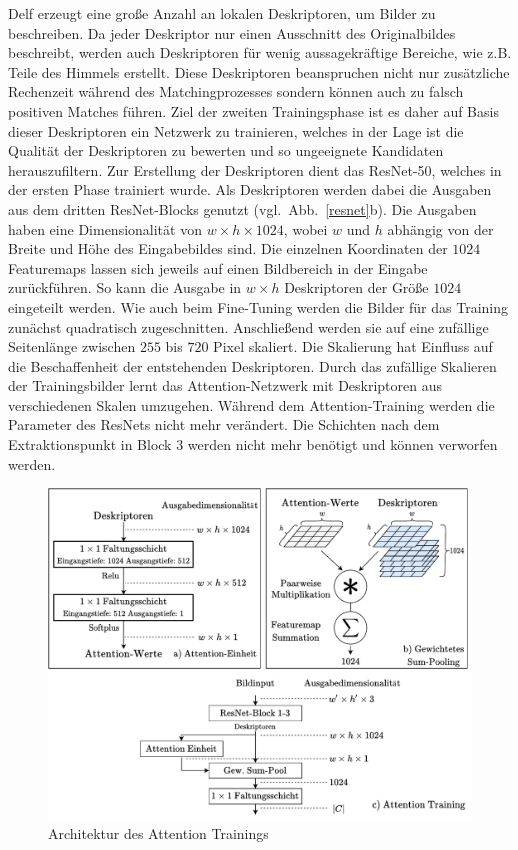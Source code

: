 Delf erzeugt eine große Anzahl an lokalen Deskriptoren, um Bilder zu beschreiben. Da jeder Deskriptor nur einen Ausschnitt des Originalbildes beschreibt, werden auch Deskriptoren für wenig aussagekräftige Bereiche, wie z.B. Teile des Himmels erstellt. Diese Deskriptoren beanspruchen nicht nur zusätzliche Rechenzeit während des Matchingprozesses sondern können auch zu falsch positiven Matches führen. Ziel der zweiten Trainingsphase ist es daher auf Basis dieser Deskriptoren ein Netzwerk zu trainieren, welches in der Lage ist die Qualität der Deskriptoren zu bewerten und so ungeeignete Kandidaten herauszufiltern. 
Zur Erstellung der Deskriptoren dient das ResNet-50, welches in der ersten Phase trainiert wurde. Als Deskriptoren werden dabei die Ausgaben aus dem dritten ResNet-Blocks genutzt (vgl.~Abb.~\ref{resnet}b). Die Ausgaben haben eine Dimensionalität von $w\times h\times 1024$, wobei $w$ und $h$ abhängig von der Breite und Höhe des Eingabebildes sind. Die einzelnen Koordinaten der $1024$ Featuremaps lassen sich jeweils auf einen Bildbereich in der Eingabe zurückführen. So kann die Ausgabe in $w \times h$ Deskriptoren der Größe $1024$ eingeteilt werden. Wie auch beim Fine-Tuning werden die Bilder für das Training zunächst quadratisch zugeschnitten. Anschließend werden sie auf eine zufällige Seitenlänge zwischen $255$ bis $720$ Pixel skaliert. Die Skalierung hat Einfluss auf die Beschaffenheit der entstehenden Deskriptoren. Durch das zufällige Skalieren der Trainingsbilder lernt das Attention-Netzwerk mit Deskriptoren aus verschiedenen Skalen umzugehen. Während dem Attention-Training werden die Parameter des ResNets nicht mehr verändert. Die Schichten nach dem Extraktionspunkt in Block 3 werden nicht mehr benötigt und können verworfen werden. \\
\begin{figure}[h]
\centering
\includegraphics[scale=0.77]{attention_spaced.pdf}
\caption{Architektur des Attention Trainings}
\label{attention}
\end{figure}

